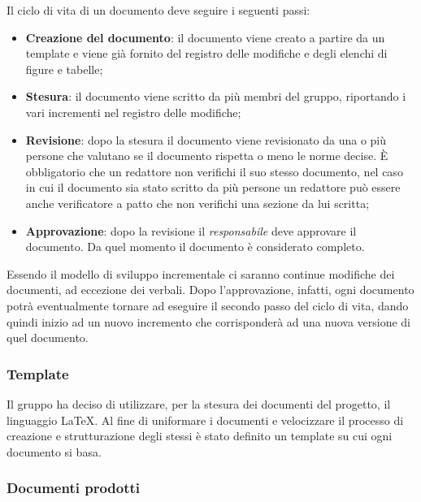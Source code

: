 Il ciclo di vita di un documento deve seguire i seguenti passi:
\begin{itemize}
    \item \textbf{Creazione del documento}: il documento viene creato a partire da un template e viene già fornito del registro delle modifiche e degli elenchi di figure e tabelle;
    \item \textbf{Stesura}: il documento viene scritto da più membri del gruppo, riportando i vari incrementi nel registro delle modifiche;
    \item \textbf{Revisione}: dopo la stesura il documento viene revisionato da una o più persone che valutano se il documento rispetta o meno le norme decise. È obbligatorio che un redattore non verifichi il suo stesso documento, nel caso in cui il documento sia stato scritto da più persone un redattore può essere anche verificatore a patto che non verifichi una sezione da lui scritta;
    \item \textbf{Approvazione}: dopo la revisione il \emph{responsabile} deve approvare il documento. Da quel momento il documento è considerato completo.
\end{itemize}
Essendo il modello di sviluppo incrementale ci saranno continue modifiche dei documenti, ad eccezione dei verbali. Dopo l'approvazione, infatti, ogni documento potrà eventualmente tornare ad eseguire il secondo passo del ciclo
di vita, dando quindi inizio ad un nuovo incremento che corrisponderà ad una nuova versione di quel documento.

\subsubsection{Template}
\label{ssub:template}

Il gruppo ha deciso di utilizzare, per la stesura dei documenti del progetto, il linguaggio \LaTeX. Al fine di 
uniformare i documenti e velocizzare il processo di creazione e strutturazione degli stessi è stato definito un 
template su cui ogni documento si basa.

\subsubsection{Documenti prodotti}
\label{ssub:documenti_prodotti}


